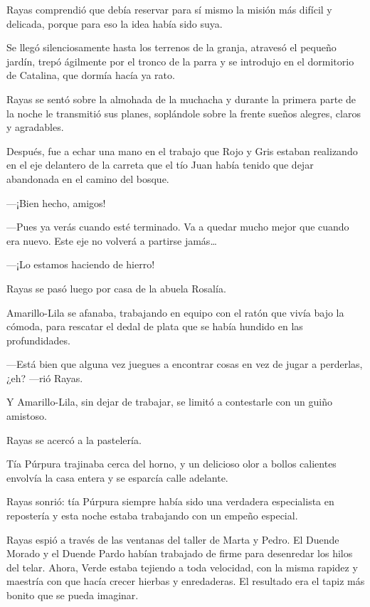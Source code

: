 \documentclass{barcodevapor3pags}
\begin{document}
Rayas comprendió que debía reservar para sí mismo la misión más difícil
y delicada, porque para eso la idea había sido suya.

Se llegó silenciosamente hasta los terrenos de la granja, atravesó el
pequeño jardín, trepó ágilmente por el tronco de la parra y se introdujo
en el dormitorio de Catalina, que dormía hacía ya rato.

Rayas se sentó sobre la almohada de la muchacha y durante la primera
parte de la noche le transmitió sus planes, soplándole sobre la frente
sueños alegres, claros y agradables.

Después, fue a echar una mano en el trabajo que Rojo y Gris estaban
realizando en el eje delantero de la carreta que el tío Juan había
tenido que dejar abandonada en el camino del bosque.

---¡Bien hecho, amigos!

---Pues ya verás cuando esté terminado. Va a quedar mucho mejor que
cuando era nuevo. Este eje no volverá a partirse jamás\ldots{}

---¡Lo estamos haciendo de hierro!

Rayas se pasó luego por casa de la abuela Rosalía.

Amarillo-Lila se afanaba, trabajando en equipo con el ratón que vivía
bajo la cómoda, para rescatar el dedal de plata que se había hundido en
las profundidades.

---Está bien que alguna vez juegues a encontrar cosas en vez de jugar a
perderlas, ¿eh? ---rió Rayas.

Y Amarillo-Lila, sin dejar de trabajar, se limitó a contestarle con un
guiño amistoso.

Rayas se acercó a la pastelería.

Tía Púrpura trajinaba cerca del horno, y un delicioso olor a bollos
calientes envolvía la casa entera y se esparcía calle adelante.

Rayas sonrió: tía Púrpura siempre había sido una verdadera especialista
en repostería y esta noche estaba trabajando con un empeño especial.


Rayas espió a través de las ventanas del taller de Marta y Pedro. El
Duende Morado y el Duende Pardo habían trabajado de firme para
desenredar los hilos del telar. Ahora, Verde estaba tejiendo a toda
velocidad, con la misma rapidez y maestría con que hacía crecer hierbas
y enredaderas. El resultado era el tapiz más bonito que se pueda
imaginar.
\end{document}
